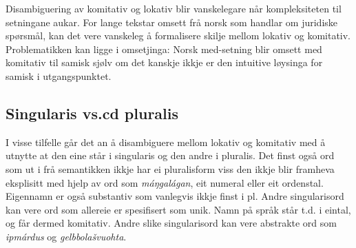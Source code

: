 \documentclass[a4paper,norsk]{article}
\begin{document}
Disambiguering av komitativ og lokativ blir vanskelegare når kompleksiteten til setningane aukar. For lange tekstar omsett frå norsk som handlar om juridiske spørsmål, kan det vere vanskeleg å formalisere skilje mellom lokativ og komitativ. Problematikken kan ligge i omsetjinga: Norsk med-setning blir omsett med komitativ til samisk sjølv om det kanskje ikkje er den intuitive løysinga for samisk i utgangspunktet. %




\subsection{Singularis vs.cd pluralis}

I visse tilfelle  går det an å disambiguere mellom lokativ og komitativ med å utnytte at den eine står i singularis og den andre i pluralis. %
Det finst også ord som ut i frå semantikken ikkje har ei pluralisform viss den ikkje blir framheva eksplisitt med hjelp av ord som \textit{máŋgalágan}, eit numeral eller eit ordenstal. Eigennamn er også substantiv som vanlegvis ikkje finst i pl. Andre singularisord kan vere ord som allereie er spesifisert som unik. Namn på språk står t.d. i eintal, og får dermed komitativ. Andre slike singularisord kan vere abstrakte ord som \emph{ipmárdus} og \emph{gelbbolašvuohta}. %
\end{document}
